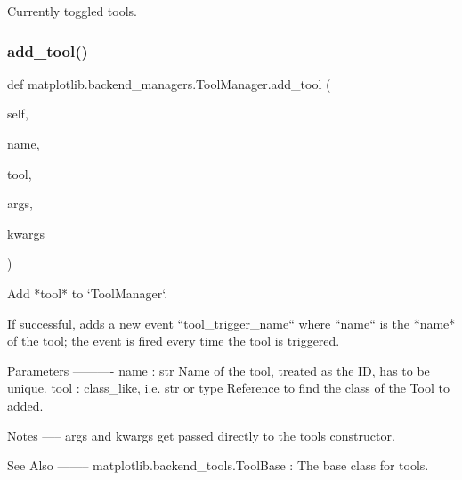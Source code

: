 \begin{DoxyVerb}Currently toggled tools.\end{DoxyVerb}
 \mbox{\label{classmatplotlib_1_1backend__managers_1_1ToolManager_a03cca2a1e94b52ac37f53b0906aa3521}} 
\subsubsection{\texorpdfstring{add\+\_\+tool()}{add\_tool()}}
{\footnotesize\ttfamily def matplotlib.\+backend\+\_\+managers.\+Tool\+Manager.\+add\+\_\+tool (\begin{DoxyParamCaption}\item[{}]{self,  }\item[{}]{name,  }\item[{}]{tool,  }\item[{}]{args,  }\item[{}]{kwargs }\end{DoxyParamCaption})}

\begin{DoxyVerb}Add *tool* to `ToolManager`.

If successful, adds a new event ``tool_trigger_{name}`` where
``{name}`` is the *name* of the tool; the event is fired every time the
tool is triggered.

Parameters
----------
name : str
    Name of the tool, treated as the ID, has to be unique.
tool : class_like, i.e. str or type
    Reference to find the class of the Tool to added.

Notes
-----
args and kwargs get passed directly to the tools constructor.

See Also
--------
matplotlib.backend_tools.ToolBase : The base class for tools.
\end{DoxyVerb}
 \mbox{\label{classmatplotlib_1_1backend__managers_1_1ToolManager_a1e62e5a862bfcbc54b5f1172df8fcc9f}} 
